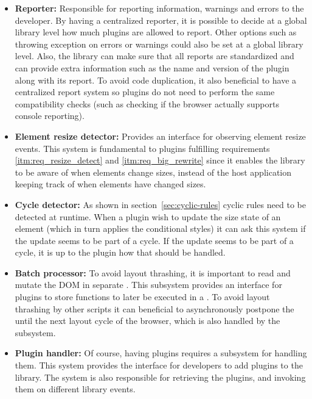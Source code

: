 \documentclass[a4paper,11pt]{kth-mag}
\begin{document}
      \begin{itemize}
        \item \textbf{Reporter:}
          Responsible for reporting information, warnings and errors to the developer.
          By having a centralized reporter, it is possible to decide at a global library level how much plugins are allowed to report.
          Other options such as throwing exception on errors or warnings could also be set at a global library level.
          Also, the library can make sure that all reports are standardized and can provide extra information such as the name and version of the plugin along with its report.
          To avoid code duplication, it also beneficial to have a centralized report system so plugins do not need to perform the same compatibility checks (such as checking if the \gls{browser} actually supports console reporting).
        \item \textbf{Element resize detector:}
          Provides an interface for observing \gls{element} resize events.
          This system is fundamental to plugins fulfilling requirements \ref{itm:req_resize_detect} and \ref{itm:req_big_rewrite} since it enables the library to be aware of when \glspl{element} change sizes, instead of the host application keeping track of when \glspl{element} have changed sizes.
        \item \textbf{Cycle detector:}
          As shown in section~\ref{sec:cyclic-rules} cyclic rules need to be detected at runtime.
          When a plugin wish to update the size state of an \gls{element} (which in turn applies the conditional styles) it can ask this system if the update seems to be part of a cycle.
          If the update seems to be part of a cycle, it is up to the plugin how that should be handled.
        \item \textbf{Batch processor:}
          To avoid \gls{layout thrashing}, it is important to read and mutate the \gls{DOM} in separate .
          This subsystem provides an interface for plugins to store functions to later be executed in a .
          To avoid \gls{layout thrashing} by other scripts it can beneficial to asynchronously postpone the  until the next layout cycle of the \gls{browser}, which is also handled by the subsystem.
        \item \textbf{Plugin handler:}
          Of course, having plugins requires a subsystem for handling them.
          This system provides the interface for developers to add plugins to the library.
          The system is also responsible for retrieving the plugins, and invoking them on different library events.
      \end{itemize}
\end{document}
